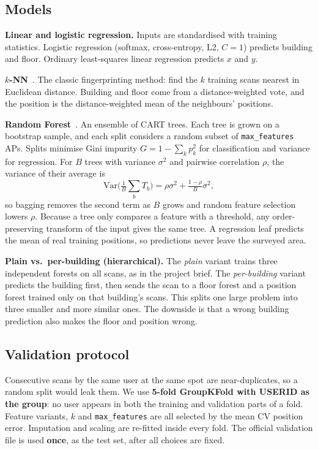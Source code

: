 \documentclass[conference]{IEEEtran}
\begin{document}
\subsection{Models}
\textbf{Linear and logistic regression.} Inputs are standardised with training statistics. Logistic
regression (softmax, cross-entropy, L2, $C=1$) predicts building and floor. Ordinary least-squares linear
regression predicts $x$ and $y$.

\textbf{$k$-NN}~\cite{cover1967nn}. The classic fingerprinting method: find the $k$ training scans
nearest in Euclidean distance. Building and floor come from a distance-weighted vote, and the position is the
distance-weighted mean of the neighbours' positions.

\textbf{Random Forest}~\cite{breiman2001rf}. An ensemble of CART trees. Each tree is grown on a bootstrap
sample, and each split considers a random subset of \texttt{max\_features} APs. Splits minimise Gini impurity
$G=1-\sum_k p_k^2$ for classification and variance for regression. For $B$ trees with variance $\sigma^2$ and
pairwise correlation $\rho$, the variance of their average is
\begin{equation}
\mathrm{Var}\Big(\tfrac{1}{B}\textstyle\sum_b T_b\Big)=\rho\sigma^2+\tfrac{1-\rho}{B}\sigma^2,
\end{equation}
so bagging removes the second term as $B$ grows and random feature selection lowers $\rho$.
Because a tree only compares a feature with a threshold, any order-preserving transform of the input gives the same tree.
A regression leaf predicts the mean of real training positions, so predictions never leave the surveyed area.

\textbf{Plain vs.\ per-building (hierarchical).} The \emph{plain} variant trains three independent forests on all
scans, as in the project brief. The \emph{per-building} variant predicts the building first, then sends the scan to a floor
forest and a position forest trained only on that building's scans. This splits one large problem into three
smaller and more similar ones. The downside is that a wrong building prediction also makes the floor and position wrong.

\subsection{Validation protocol}
Consecutive scans by the same user at the same spot are near-duplicates, so a random split would leak them. We use
\textbf{5-fold GroupKFold with USERID as the group}: no user appears in both the training and validation parts of a fold. Feature
variants, $k$ and \texttt{max\_features} are all selected by the mean CV position error. Imputation and scaling are
re-fitted inside every fold. The official validation file is used \textbf{once}, as the test set, after all
choices are fixed.
\end{document}
